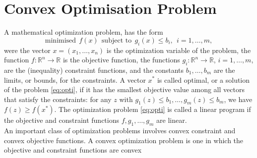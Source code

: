 \documentclass[a4paper,12pt,openany]{report}
\theoremstyle{plain}
\theoremstyle{plain}
\theoremstyle{plain}
\theoremstyle{plain}
\theoremstyle{plain}
\theoremstyle{plain}
\theoremstyle{plain}
\theoremstyle{plain}
\theoremstyle{plain}
\theoremstyle{plain}
\theoremstyle{plain}
\theoremstyle{plain}
\begin{document}
\section{Convex Optimisation Problem}
A mathematical optimization problem, has the form
\begin{equation}\label{eq:opti}
\text{minimised} \ \ f(x) \ \ \text{subject to} \ \ g_i(x)\leq b_i, \ \ i=1,\ldots,m,
\end{equation}
were the vector $x = (x_1,\ldots, x_n)$ is the optimization variable of the problem, the
function $f : \mathbb{R}^n\to\mathbb{R}$ is the objective function, the functions $g_i : \mathbb{R}^n\to\mathbb{R}$,
$i = 1,\ldots, m$, are the (inequality) constraint functions, and the constants $b_1,\ldots, b_m$
are the limits, or bounds, for the constraints. A vector $x^*$ is called optimal, or a
solution of the problem \eqref{eq:opti}, if it has the smallest objective value among all vectors
that satisfy the constraints: for any $z$ with $g_1(z) \leq b_1,\ldots,g_m(z) \leq b_m$, we have
$f(z) \geq f(x^*)$. The optimization problem \eqref{eq:opti} is called a linear program if the objective
and constraint functions $f,g_1,\ldots,g_m$ are linear.\\
An important class of optimization problems involves convex constraint and convex objective functions. A convex optimization problem is one in which the objective and
constraint functions are convex
\end{document}
